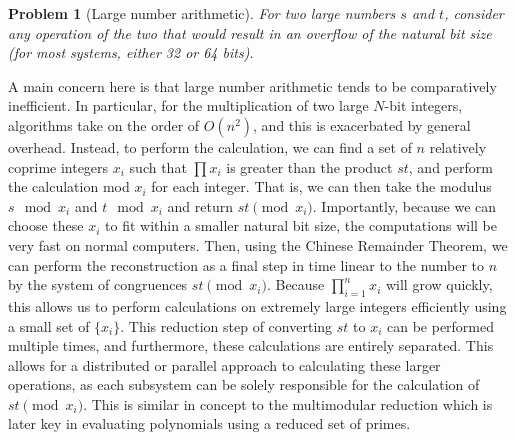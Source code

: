 \documentclass[pageno]{jpaper}
\newtheorem{problem}{Problem}[section]
\begin{document}
\begin{problem}[Large number arithmetic]
  For two large numbers $s$ and $t$, consider any operation of the two that would result in an overflow of the natural bit size (for most systems, either 32 or 64 bits).
\end{problem}
A main concern here is that large number arithmetic tends to be comparatively inefficient.
In particular, for the multiplication of two large $N$-bit integers, algorithms take on the order of $O(n^2)$, and this is exacerbated by general overhead.
Instead, to perform the calculation, we can find a set of $n$ relatively coprime integers $x_i$ such that $\prod x_i$ is greater than the product $st$, and perform the calculation mod $x_i$ for each integer.
That is, we can then take the modulus $s\mod x_i$ and $t\mod x_i$ and return $st\pmod x_i$.
Importantly, because we can choose these $x_i$ to fit within a smaller natural bit size, the computations will be very fast on normal computers.
Then, using the Chinese Remainder Theorem, we can perform the reconstruction as a final step in time linear to the number to $n$ by the system of congruences $st\pmod x_i$.
Because $\prod_{i=1}^n x_i$ will grow quickly, this allows us to perform calculations on extremely large integers efficiently using a small set of $\{x_i\}$.
This reduction step of converting $st$ to $x_i$ can be performed multiple times, and furthermore, these calculations are entirely separated.
This allows for a distributed or parallel approach to calculating these larger operations, as each subsystem can be solely responsible for the calculation of $st\pmod x_i$.
This is similar in concept to the multimodular reduction which is later key in evaluating polynomials using a reduced set of primes.
\end{document}
